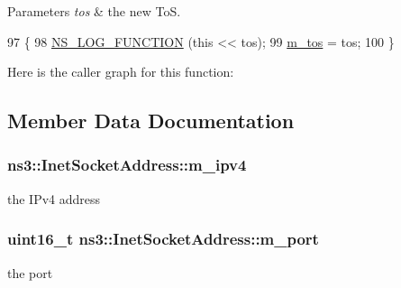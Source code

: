 \begin{DoxyParams}{Parameters}
{\em tos} & the new ToS. \\
\hline
\end{DoxyParams}

\begin{DoxyCode}
97 \{
98   \hyperlink{log-macros-disabled_8h_a90b90d5bad1f39cb1b64923ea94c0761}{NS\_LOG\_FUNCTION} (\textcolor{keyword}{this} << tos);
99   \hyperlink{classns3_1_1InetSocketAddress_ade08598c815f5639ddeee826ee23b6ca}{m\_tos} = tos;
100 \}
\end{DoxyCode}


Here is the caller graph for this function\+:




\subsection{Member Data Documentation}
\subsubsection[{\texorpdfstring{m\+\_\+ipv4}{m_ipv4}}]{ ns3\+::\+Inet\+Socket\+Address\+::m\+\_\+ipv4\hspace{0.3cm}{\ttfamily [private]}}\hypertarget{classns3_1_1InetSocketAddress_ab84d6b269045f0d1bba61ab9a8705d39}{}\label{classns3_1_1InetSocketAddress_ab84d6b269045f0d1bba61ab9a8705d39}


the I\+Pv4 address 

\subsubsection[{\texorpdfstring{m\+\_\+port}{m_port}}]{\setlength{\rightskip}{0pt plus 5cm}uint16\+\_\+t ns3\+::\+Inet\+Socket\+Address\+::m\+\_\+port\hspace{0.3cm}{\ttfamily [private]}}\hypertarget{classns3_1_1InetSocketAddress_a584697b01f1b44c5c1a5dcae5773e5d5}{}\label{classns3_1_1InetSocketAddress_a584697b01f1b44c5c1a5dcae5773e5d5}


the port 

